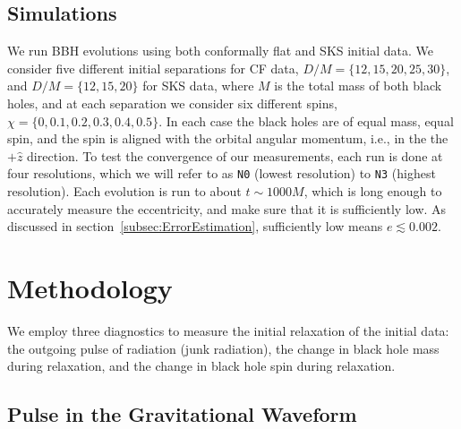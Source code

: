 
\subsection{Simulations}

We run BBH evolutions using both conformally flat and SKS initial
data.  We consider five different initial separations for CF data,
$D/M=\{12,15,20,25,30\}$, and $D/M=\{12,15,20\}$ for SKS data, where $M$ is the total mass of both black
holes, and at each separation we consider  six different spins,
$\chi=\{0,0.1,0.2,0.3,0.4,0.5\}$. In each case the black holes are of
equal mass, equal spin, and the spin is aligned with the orbital
angular momentum, i.e., in the the $+\hat{z}$ direction. To test the
convergence of our measurements, each run is done at four
resolutions, which we will refer to as {\tt N0} (lowest resolution) to
{\tt N3}
(highest resolution). Each evolution is
run to about $t\sim1000M$, which is long enough to accurately measure the
eccentricity, and make sure that it is sufficiently low. As discussed in
section~\ref{subsec:ErrorEstimation}, sufficiently low means
$e\lesssim 0.002$.

\section{Methodology}
\label{sec:Methodology}

We employ three diagnostics to measure the initial relaxation of
the initial data: the outgoing pulse of radiation (junk radiation),
the change in black hole mass during relaxation, and the change in
black hole spin during relaxation.



\subsection{Pulse in the Gravitational Waveform}

